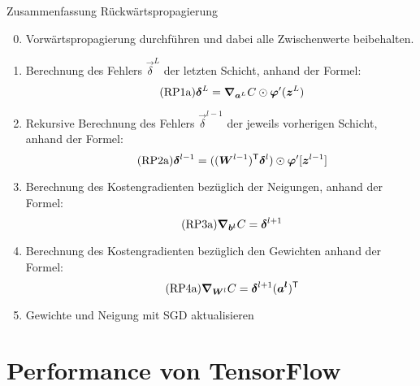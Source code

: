 \begin{appendices}
\begin{graybox}{Zusammenfassung Rückwärtspropagierung}
  \begin{enumerate}
    \setcounter{enumi}{-1}
  \item{Vorwärtspropagierung durchführen und dabei alle Zwischenwerte beibehalten.}
    \item{Berechnung des Fehlers $\vec{\delta}^L$ der letzten Schicht, anhand
        der Formel:
      \begin{equation}\tag{RP1a}
        \bm{\delta}^L = \bm{\nabla}_{\bm{a}^L}C \odot \bm{\varphi}'(\bm{z}^L)
      \end{equation}
      }
      \item{Rekursive Berechnung des Fehlers $\vec{\delta}^{l-1}$ der jeweils
          vorherigen Schicht, anhand der Formel:
          \begin{equation}\tag{RP2a}
            \bm{\delta}^{l-1} = ((\bm{W}^{l-1})^{\mathsf{T}} \bm{\delta}^l) \odot \bm{\varphi}'[\bm{z}^{l-1}]
          \end{equation}
        }
      \item{Berechnung des Kostengradienten bezüglich der Neigungen, anhand der Formel:
          \begin{equation}\tag{RP3a}
            \bm{\nabla}_{\bm{b^l}} C =  \bm{\delta}^{l+1}
          \end{equation}
        }
      \item{Berechnung des Kostengradienten bezüglich den Gewichten anhand der Formel:
          \begin{equation}\tag{RP4a}
            \bm{\nabla}_{\bm{W}^l} C = \bm{\delta}^{l+1} (\bm{a^l})^{\mathsf{T}}
          \end{equation}
        }
      \item{Gewichte und Neigung mit SGD aktualisieren}
  \end{enumerate}
\end{graybox}

\para{}
\cite{Nielsen}
\cite{rojas}
\cite{ma:deep_learning}

\chapter{Performance von TensorFlow}\label{sec:anhang_tf}

\end{appendices}
